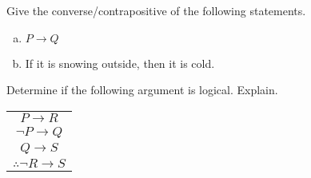 \documentclass[11pt,letterpaper]{article}
\begin{document}
\newpage



 Give the converse/contrapositive of the following statements. 
	\begin{enumerate}[(a)]
	\item $P \to Q$
	\item If it is snowing outside, then it is cold.
	\end{enumerate}



\newpage



 Determine if the following argument is logical. Explain. 
	\begin{table}[!ht]
	\centering
	\begin{tabular}{c}
	$P \to R$ \\
	$\neg P \to Q$ \\
	$Q \to S$ \\ \hline
	$\therefore \neg R \to S$
	\end{tabular}
	\end{table}
\end{document}
